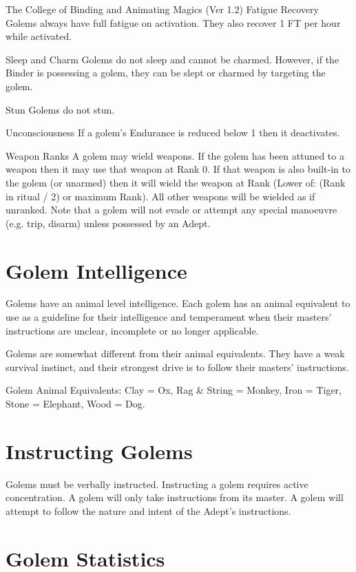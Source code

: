 \begin{Chapter}{The College of Binding and Animating Magics (Ver 1.2)}
Fatigue Recovery Golems always have full fatigue 
on  activation.  They  also  recover  1  FT  per  hour 
while activated. 

Sleep and Charm Golems do not sleep and cannot 
be charmed. However, if the Binder is possessing a 
golem,  they  can  be  slept  or  charmed  by  targeting 
the golem. 

Stun Golems do not stun. 

Unconsciousness  If  a  golem’s  Endurance  is  reduced below 1 then it deactivates. 

Weapon  Ranks  A  golem  may  wield  weapons.  If 
the  golem  has  been  attuned  to  a  weapon  then  it 
may  use  that  weapon  at Rank 0.  If  that  weapon  is 
also built-in to the golem (or unarmed) then it will 
wield  the  weapon  at  Rank  (Lower  of:  (Rank  in 
ritual  /  2)  or  maximum  Rank).  All  other  weapons 
will  be  wielded  as  if  unranked.  Note  that  a  golem 
will  not  evade  or  attempt  any  special  manoeuvre 
(e.g. trip, disarm) unless possessed by an Adept. 

\section{Golem Intelligence}

Golems have an animal level intelligence.  Each golem has an animal
equivalent to use as a guideline for their intelligence and
temperament when their masters’ instructions are unclear, incomplete
or no longer applicable.

Golems are somewhat different from their animal equivalents.  They
have a weak survival instinct, and their strongest drive is to follow
their masters’ instructions.

Golem Animal Equivalents: Clay = Ox, Rag \& String = Monkey, Iron =
Tiger, Stone = Elephant, Wood = Dog.

\section{Instructing Golems}

Golems must be verbally instructed.  Instructing a golem requires
active concentration. A golem will only take instructions from its
master.  A golem will attempt to follow the nature and intent of the
Adept’s instructions.


\section{Golem Statistics}


\end{Chapter}
